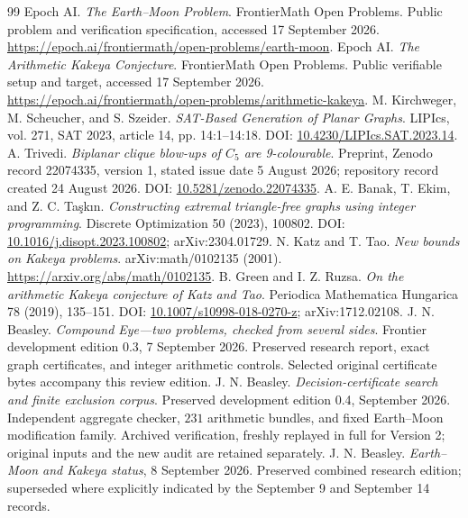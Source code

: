 \documentclass[11pt,letterpaper]{article}
\theoremstyle{definition}
\theoremstyle{remark}\newtheorem{remark}[theorem]{Remark}
\begin{document}
\begin{thebibliography}{99}
 Epoch AI. \emph{The Earth--Moon Problem}. FrontierMath Open Problems. Public problem and verification specification, accessed 17 September 2026. \url{https://epoch.ai/frontiermath/open-problems/earth-moon}.
 Epoch AI. \emph{The Arithmetic Kakeya Conjecture}. FrontierMath Open Problems. Public verifiable setup and target, accessed 17 September 2026. \url{https://epoch.ai/frontiermath/open-problems/arithmetic-kakeya}.
 M. Kirchweger, M. Scheucher, and S. Szeider. \emph{SAT-Based Generation of Planar Graphs}. LIPIcs, vol. 271, SAT 2023, article 14, pp. 14:1--14:18. DOI: \href{https://doi.org/10.4230/LIPIcs.SAT.2023.14}{10.4230/LIPIcs.SAT.2023.14}.
 A. Trivedi. \emph{Biplanar clique blow-ups of $C_5$ are 9-colourable}. Preprint, Zenodo record 22074335, version 1, stated issue date 5 August 2026; repository record created 24 August 2026. DOI: \href{https://doi.org/10.5281/zenodo.22074335}{10.5281/zenodo.22074335}.
 A. E. Banak, T. Ekim, and Z. C. Ta\c{s}k\i n. \emph{Constructing extremal triangle-free graphs using integer programming}. Discrete Optimization 50 (2023), 100802. DOI: \href{https://doi.org/10.1016/j.disopt.2023.100802}{10.1016/j.disopt.2023.100802}; arXiv:2304.01729.
 N. Katz and T. Tao. \emph{New bounds on Kakeya problems}. arXiv:math/0102135 (2001). \url{https://arxiv.org/abs/math/0102135}.
 B. Green and I. Z. Ruzsa. \emph{On the arithmetic Kakeya conjecture of Katz and Tao}. Periodica Mathematica Hungarica 78 (2019), 135--151. DOI: \href{https://doi.org/10.1007/s10998-018-0270-z}{10.1007/s10998-018-0270-z}; arXiv:1712.02108.
 J. N. Beasley. \emph{Compound Eye---two problems, checked from several sides}. Frontier development edition 0.3, 7 September 2026. Preserved research report, exact graph certificates, and integer arithmetic controls. Selected original certificate bytes accompany this review edition.
 J. N. Beasley. \emph{Decision-certificate search and finite exclusion corpus}. Preserved development edition 0.4, September 2026. Independent aggregate checker, $231$ arithmetic bundles, and fixed Earth--Moon modification family. Archived verification, freshly replayed in full for Version 2; original inputs and the new audit are retained separately.
 J. N. Beasley. \emph{Earth--Moon and Kakeya status}, 8 September 2026. Preserved combined research edition; superseded where explicitly indicated by the September 9 and September 14 records.

\end{thebibliography}
\end{document}
